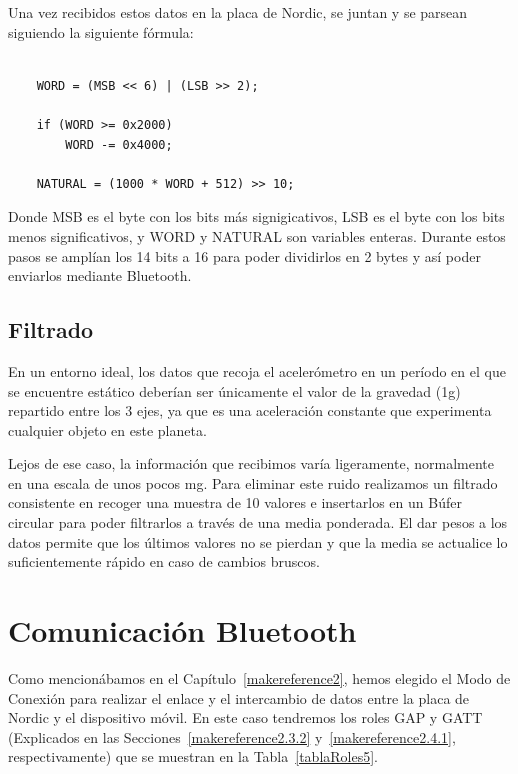Una vez recibidos estos datos en la placa de Nordic, se juntan y se parsean siguiendo la siguiente fórmula:

\begin{lstlisting}[frame=single]

	WORD = (MSB << 6) | (LSB >> 2);
	
	if (WORD >= 0x2000)
		WORD -= 0x4000;

	NATURAL = (1000 * WORD + 512) >> 10;

\end{lstlisting}

Donde MSB es el byte con los bits más signigicativos, LSB es el byte con los bits menos significativos, y WORD y NATURAL son variables enteras. Durante estos pasos se amplían los 14 bits a 16 para poder dividirlos en 2 bytes y así poder enviarlos mediante Bluetooth.

\subsection{Filtrado}
\label{makereference5.4.2}

En un entorno ideal, los datos que recoja el acelerómetro en un período en el que se encuentre estático deberían ser únicamente el valor de la gravedad (1g) repartido entre los 3 ejes, ya que es una aceleración constante que experimenta cualquier objeto en este planeta.

Lejos de ese caso, la información que recibimos varía ligeramente, normalmente en una escala de unos pocos mg. Para eliminar este ruido realizamos un filtrado consistente en recoger una muestra de 10 valores e insertarlos en un Búfer circular para poder filtrarlos a través de una media ponderada. El dar pesos a los datos permite que los últimos valores no se pierdan y que la media se actualice lo suficientemente rápido en caso de cambios bruscos.

\section{Comunicación Bluetooth}
\label{makereference5.2}

Como mencionábamos en el Capítulo~\ref{makereference2}, hemos elegido el Modo de Conexión para realizar el enlace y el intercambio de datos entre la placa de Nordic y el dispositivo móvil. En este caso tendremos los roles GAP y GATT (Explicados en las Secciones~\ref{makereference2.3.2} y~\ref{makereference2.4.1}, respectivamente) que se muestran en la Tabla~\ref{tablaRoles5}. 

